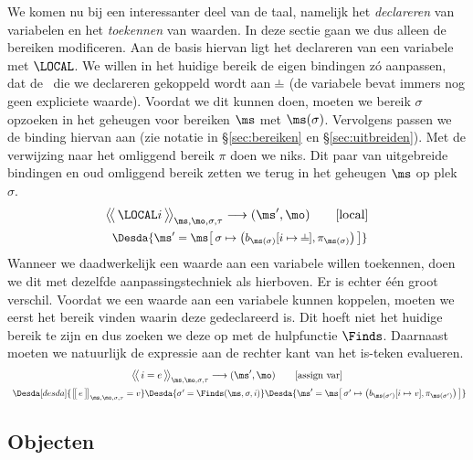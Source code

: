 We komen nu bij een interessanter deel van de taal, namelijk het \emph{declareren} van variabelen en het \emph{toekennen} van waarden. In deze sectie gaan we dus alleen de bereiken modificeren. Aan de basis hiervan ligt het declareren van een variabele met $\LOCAL$. We willen in het huidige bereik de eigen bindingen zó aanpassen, dat de \Id\ die we declareren gekoppeld wordt aan $\nil$ (de variabele bevat immers nog geen expliciete waarde). Voordat we dit kunnen doen, moeten we bereik $\sigma$ opzoeken in het geheugen voor bereiken $\ms$ met $\ms(\sigma)$. Vervolgens passen we de binding hiervan aan (zie notatie in §\ref{sec:bereiken} en §\ref{sec:uitbreiden}). Met de verwijzing naar het omliggend bereik $\pi$ doen we niks. Dit paar van uitgebreide bindingen en oud omliggend bereik zetten we terug in het geheugen $\ms$ op plek $\sigma$.
%
\begin{gather*}
  \Config{\LOCAL i}{\ms, \mo, \sigma, \tau}
  \longrightarrow
  (\ms', \mo)
  \tag*{[local]} \\
  \Desdas{
    \Desda{\ms' = \ms \surr{ \sigma \mapsto \big(b_{\ms(\sigma)}[i \mapsto \BOT], \pi_{\ms(\sigma)}\big) }}
  }
\end{gather*}
%
Wanneer we daadwerkelijk een waarde aan een variabele willen toekennen, doen we dit met dezelfde aanpassingstechniek als hierboven. Er is echter één groot verschil. Voordat we een waarde aan een variabele kunnen koppelen, moeten we eerst het bereik vinden waarin deze gedeclareerd is. Dit hoeft niet het huidige bereik te zijn en dus zoeken we deze op met de hulpfunctie $\Finds$. Daarnaast moeten we natuurlijk de expressie aan de rechter kant van het is-teken evalueren.
%
\begin{gather*}
  \Config{i = e}{\ms, \mo, \sigma, \tau}
  \longrightarrow
  (\ms', \mo)
  \tag*{[assign var]} \\
  \Desdas{
    \Desda[desda]{\Express{e}{\ms, \mo, \sigma, \tau} = v}
    \Desda{\sigma' = \Finds(\ms, \sigma, i)}
    \Desda{\ms'= \ms \surr{ \sigma' \mapsto \big(b_{\ms(\sigma')}[ i \mapsto v ], \pi_{\ms(\sigma')}\big) }}
  }
\end{gather*}

\subsection{Objecten}

